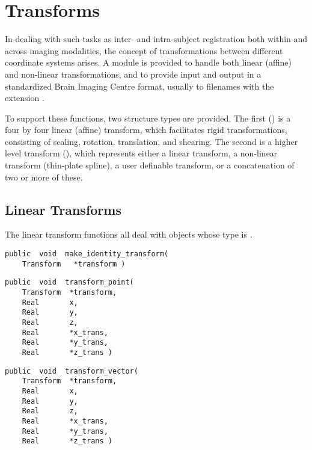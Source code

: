 \chapter{Transforms}

In dealing with such tasks as inter- and intra-subject registration
both within and across imaging modalities, the concept of
transformations between different coordinate systems arises.  A module
is provided to handle both linear (affine) and non-linear
transformations, and to provide input and output in a standardized
Brain Imaging Centre format, usually to filenames with the extension
.

To support these functions, two structure types are provided.  The
first () is a four by four linear (affine) transform,
which facilitates rigid transformations, consisting of scaling, rotation,
translation, and shearing.  The second is a higher level transform
(), which represents either a linear
transform, a non-linear transform (thin-plate spline), a user
definable transform, or a concatenation of two or more of these.

\section{Linear Transforms}

The linear transform functions all deal with objects whose type is
.

{\bf\begin{verbatim}
public  void  make_identity_transform(
    Transform   *transform )
\end{verbatim}}


{\bf\begin{verbatim}
public  void  transform_point(
    Transform  *transform,
    Real       x,
    Real       y,
    Real       z,
    Real       *x_trans,
    Real       *y_trans,
    Real       *z_trans )
\end{verbatim}}


{\bf\begin{verbatim}
public  void  transform_vector(
    Transform  *transform,
    Real       x,
    Real       y,
    Real       z,
    Real       *x_trans,
    Real       *y_trans,
    Real       *z_trans )
\end{verbatim}}

